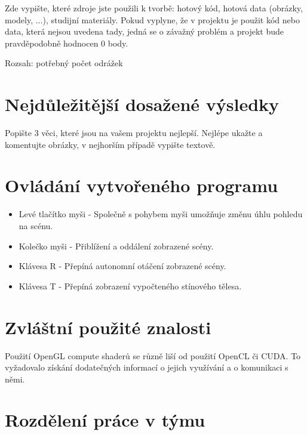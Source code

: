 \documentclass[11pt,a4paper]{article}
\begin{document}
Zde vypište, které zdroje jste použili k tvorbě: hotový kód, hotová data
(obrázky, modely, $\ldots$), studijní materiály. Pokud vyplyne, že v projektu
je použit kód nebo data, která nejsou uvedena tady, jedná se o závažný problém
a projekt bude pravděpodobně hodnocen 0 body.

Rozsah: potřebný počet odrážek

\section{Nejdůležitější dosažené výsledky}

Popište 3 věci, které jsou na vašem projektu nejlepší. Nejlépe ukažte a
komentujte obrázky, v nejhorším případě vypište textově.

\section{Ovládání vytvořeného programu}

\begin{itemize}
	\item Levé tlačítko myši - Společně s pohybem myši umožňuje změnu úhlu pohledu na scénu.
	\item Kolečko myši - Přiblížení a oddálení zobrazené scény.
	\item Klávesa R - Přepíná autonomní otáčení zobrazené scény.
	\item Klávesa T - Přepíná zobrazení vypočteného stínového tělesa.
\end{itemize}

\section{Zvláštní použité znalosti}

Použití OpenGL compute shaderů se různě liší od použití OpenCL či CUDA. To vyžadovalo získání dodatečných informací o jejich využívání a o komunikaci s němi.

\section{Rozdělení práce v týmu}
\end{document}
